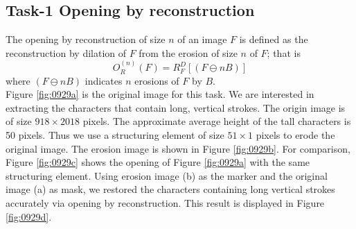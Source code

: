 \subsection{Task-1 Opening by reconstruction}
The opening by reconstruction of size $n$ of an image $F$ is defined as the reconstruction by dilation of $F$ from the erosion of size $n$ of $F$; that is \begin{equation}O_R^{(n)}(F)=R_F^D \left[ (F\ominus nB) \right]\end{equation} where $(F\ominus nB)$ indicates $n$ erosions of $F$ by $B$. \\
Figure \ref{fig:0929a} is the original image for this task. We are interested in extracting the characters that contain long, vertical strokes. The origin image is of size $918 \times 2018$ pixels. The approximate average height of the tall characters is 50 pixels. Thus we use a structuring element of size $51 \times 1$ pixels to erode the original image. The erosion image is shown in Figure \ref{fig:0929b}. For comparison, Figure \ref{fig:0929c} shows the opening of Figure \ref{fig:0929a} with the same structuring element. Using erosion image (b) as the marker and the original image (a) as mask, we restored the characters containing long vertical strokes accurately via opening by reconstruction. This result is displayed in Figure \ref{fig:0929d}. \\

